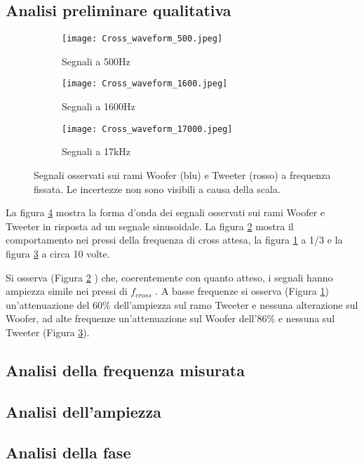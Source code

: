 \documentclass[../Relazione_circuiti]{subfiles}
\begin{document}
\subsection{Analisi preliminare qualitativa}

  \begin{figure}[H]
    \centering

    \begin{subfigure}[b]{0.3\textwidth}
      \centering
      \texttt{[image: Cross\_waveform\_500.jpeg]}

      \caption{Segnali a 500Hz}
      \label{fig:signal_500}

    \end{subfigure}
    \begin{subfigure}[b]{0.3\textwidth}
      \centering
      \texttt{[image: Cross\_waveform\_1600.jpeg]}

      \caption{Segnali a 1600Hz}
      \label{fig:signal_1600}

    \end{subfigure}
    \begin{subfigure}[b]{0.3\textwidth}
      \centering
      \texttt{[image: Cross\_waveform\_17000.jpeg]}

      \caption{Segnali a 17kHz}
      \label{fig:signal_17k}

    \end{subfigure}
    \hfill

    \caption{Segnali osservati sui rami Woofer (blu) e Tweeter (rosso)
      a frequenza fissata. Le incertezze non sono visibili a causa della scala.}
    \label{fig:signal_waveforms}

  \end{figure}

  La figura \ref{fig:signal_waveforms}
  mostra la forma d'onda dei segnali osservati sui rami Woofer e Tweeter in risposta ad un segnale sinusoidale. La
  figura \ref{fig:signal_1600} mostra il comportamento nei pressi della frequenza di cross attesa, la figura
  \ref{fig:signal_500} a 1/3 e la figura \ref{fig:signal_17k} a circa 10 volte.

  Si osserva (Figura \ref{fig:signal_1600}
  ) che, coerentemente con quanto atteso, i segnali hanno ampiezza simile nei pressi di $f_{cross}$
  . A basse frequenze si osserva (Figura \ref{fig:signal_500}) un'attenuazione del 60\%
  dell'ampiezza sul ramo Tweeter e nessuna alterazione sul Woofer, ad alte frequenze un'attenuazione sul Woofer
  dell'86\% e nessuna sul Tweeter (Figura \ref{fig:signal_17k}).

\subsection{Analisi della frequenza misurata}

\subsection{Analisi dell'ampiezza}

\subsection{Analisi della fase}
\end{document}
